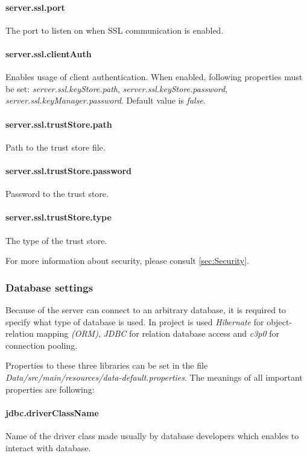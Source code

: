 \paragraph{server.ssl.port}
The port to listen on when SSL communication is enabled.

\paragraph{server.ssl.clientAuth}
Enables usage of client authentication. When enabled, following properties must
be set: \emph{server.ssl.keyStore.path}, \emph{server.ssl.keyStore.password},
\emph{server.ssl.keyManager.password}. Default value is \emph{false}.

\paragraph{server.ssl.trustStore.path}
Path to the trust store file.

\paragraph{server.ssl.trustStore.password}
Password to the trust store.

\paragraph{server.ssl.trustStore.type}
The type of the trust store.

\vspace{0.75cm}
For more information about security, please consult \ref{sec:Security}.

\subsubsection{Database settings}
\label{sssec:DataSettings}

Because of the server can connect to an arbitrary database, it is required to specify what type of database is used.
In \textan{} project is used \emph{Hibernate} for object-relation mapping \emph{(ORM)}, \emph{JDBC} for relation database access and \emph{c3p0} for connection pooling.

Properties to these three libraries can be set in the file \emph{Data/src/main/resources/data-default.properties}. The meanings of all important properties are following:


\paragraph{jdbc.driverClassName}
Name of the driver class made usually by database developers which enables to interact with database.

